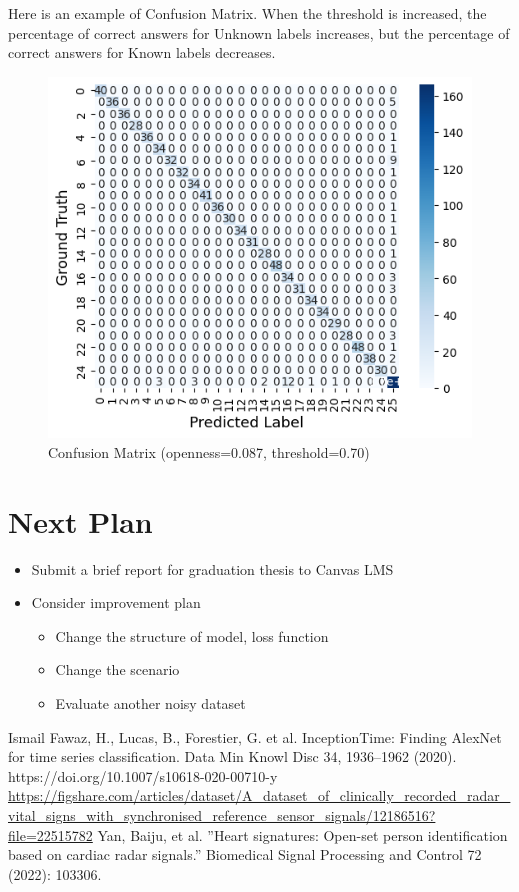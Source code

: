 \documentclass[dvipdfmx]{article}
\begin{document}
Here is an example of Confusion Matrix. When the threshold is increased, the percentage of correct answers for Unknown labels increases, but the percentage of correct answers for Known labels decreases.

\begin{figure}[H]
    \begin{center}
    \includegraphics[width=\linewidth]{./img/conf_threshold.png}
    \end{center}
    \caption{Confusion Matrix (openness=0.087, threshold=0.70)}
\end{figure}



\section{Next Plan}
\begin{itemize}
    \item Submit a brief report for graduation thesis to Canvas LMS
    \item Consider improvement plan
    \begin{itemize}
        \item Change the structure of model, loss function
        \item Change the scenario
        \item Evaluate another noisy dataset
    \end{itemize}
\end{itemize}

\begin{thebibliography}{99}
 Ismail Fawaz, H., Lucas, B., Forestier, G. et al. InceptionTime: Finding AlexNet for time series classification. Data Min Knowl Disc 34, 1936–1962 (2020). https://doi.org/10.1007/s10618-020-00710-y
 \url{https://figshare.com/articles/dataset/A_dataset_of_clinically_recorded_radar_vital_signs_with_synchronised_reference_sensor_signals/12186516?file=22515782}
 Yan, Baiju, et al. ”Heart signatures: Open-set person identification based on cardiac radar signals.” Biomedical Signal Processing and Control 72 (2022): 103306.
\end{thebibliography}
\end{document}
